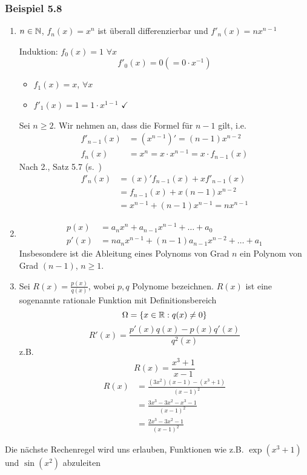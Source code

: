 \subsubsection*{Beispiel 5.8}
\begin{enumerate}
\item $n\in\mathbb{N}$, $f_n\left( x\right)=x^n$ ist überall differenzierbar und $f'_n\left( x\right) = nx^{n-1}$
\begin{beweis}{}
Induktion: $f_0\left( x\right) = 1$ $\forall x$ \[f'_0\left( x\right) = 0 \left( = 0\cdot x^{-1}\right)\]
\begin{itemize}
\item $f_1\left( x\right) = x$, $\forall x$
\item $f'_1\left( x\right) = 1 = 1\cdot x^{1-1}$ $\checkmark$
\end{itemize}
Sei $n\geq 2$. Wir nehmen an, dass die Formel für $n-1$ gilt, i.e.
\begin{align*}
f{'_{n - 1}}\left( x \right) &= \left( {{x^{n - 1}}} \right)' = \left( {n - 1} \right){x^{n - 2}}\\
{f_n}\left( x \right) &=  {x^n} = x \cdot {x^{n - 1}} = x \cdot {f_{n - 1}}\left( x \right)
\end{align*}
Nach 2., Satz 5.7 (s.~\pageref{satz5.7,2.})
\begin{align*}
f{'_n}\left( x \right) &= \left( x \right)'{f_{n - 1}}\left( x \right) + xf{'_{n - 1}}\left( x \right)\\
 &= {f_{n - 1}}\left( x \right) + x\left( {n - 1} \right){x^{n - 2}}\\
 &= {x^{n - 1}} + \left( {n - 1} \right){x^{n - 1}} = n{x^{n - 1}}
\end{align*}
\end{beweis}
\item \begin{align*}
p(x)&=a_nx^n+a_{n-1}x^{n-1}+\dots+a_0\\
p'(x)&=na_nx^{n-1}+\left( n-1\right)a_{n-1}x^{n-2}+\dots+a_1
\end{align*}
Insbesondere ist die Ableitung eines Polynoms von Grad $n$ ein Polynom von Grad $\left( n-1\right)$, $n\geq 1$.
\item Sei $R(x)=\frac{p(x)}{q(x)}$, wobei $p,q$ Polynome bezeichnen. $R(x)$ ist eine sogenannte rationale Funktion mit Definitionsbereich
\[\Omega = \left\{ x\in\mathbb{R} : q(x)\not=0\right\}\]
\[R'(x) = \frac{{p'(x)q(x) - p(x)q'(x)}}{{{q^2}(x)}}\]
z.B. \[R(x) = \frac{{{x^3} + 1}}{{x - 1}}\]
\begin{align*}
R(x) &= \frac{{\left( {3{x^2}} \right)\left( {x - 1} \right) - \left( {{x^3} + 1} \right)}}{{{{\left( {x - 1} \right)}^2}}}\\
 &= \frac{{3{x^3} - 3{x^2} - {x^3} - 1}}{{{{\left( {x - 1} \right)}^2}}}\\
 &= \frac{{2{x^3} - 3{x^2} - 1}}{{{{\left( {x - 1} \right)}^2}}}
\end{align*}
\end{enumerate}
Die nächste Rechenregel wird uns erlauben, Funktionen wie z.B. $\exp\left( x^3+1\right)$ und $\sin\left( x^2\right)$ abzuleiten

